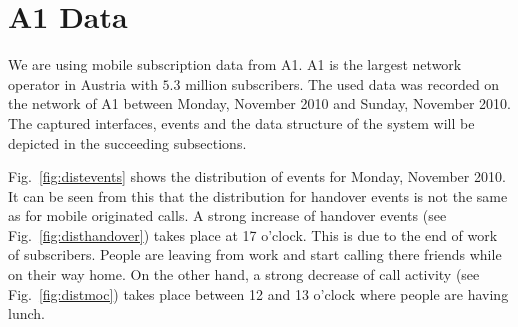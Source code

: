 \documentclass[master,english]{hgbthesis}
\begin{document}
\section{A1 Data}

We are using mobile subscription data from A1. A1 is the largest network operator in Austria with $5.3$ million subscribers. The used data was recorded on the network of A1 between Monday,  November 2010 and Sunday,  November 2010. The captured interfaces, events and the data structure of the system will be depicted in the succeeding subsections.

Fig.~\ref{fig:distevents} shows the distribution of events for Monday,  November 2010. It can be seen from this that the distribution for handover events is not the same as for mobile originated calls. A strong increase of handover events (see Fig.~\ref{fig:disthandover}) takes place at 17 o'clock. This is due to the end of work of subscribers. People are leaving from work and start calling there friends while on their way home. On the other hand, a strong decrease of call activity (see Fig.~\ref{fig:distmoc}) takes place between 12 and 13 o'clock where people are having lunch.
\end{document}
